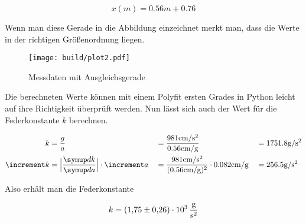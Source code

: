 \begin{equation}
x(m) = 0.56m + 0.76
\end{equation}
\begin{flushleft}
Wenn man diese Gerade in die Abbildung einzeichnet merkt man, dass die Werte in der richtigen Größenordnung liegen.
\end{flushleft}
\begin{figure}
  \centering
  \texttt{[image: build/plot2.pdf]}
  \caption{Messdaten mit Ausgleichsgerade}
  \label{fig:plot2}
\end{figure}
\begin{flushleft}
Die berechneten Werte können mit einem Polyfit ersten Grades in Python leicht auf ihre Richtigkeit überprüft werden.
Nun lässt sich auch der Wert für die Federkonstante $k$ berechnen.
\end{flushleft}
\begin{align}
k &= \frac{g}{a} &&= \frac{981\si[per-mode=symbol]{\centi\meter\per\second\squared}}{0.56\si[per-mode=symbol]{\centi\meter\per\gram}} &&= 1751.8\si[per-mode=symbol]{\gram\per\second\squared} \\
\increment k &= \Bigl| \frac{\dif{k}}{\dif{a}} \Bigr| \cdot \increment a &&= \frac{981\si[per-mode=symbol]{\centi\meter\per\second\squared}}{(0.56\si[per-mode=symbol]{\centi\meter\per\gram})^2} \cdot 0.082\si[per-mode=symbol]{\centi\meter\per\gram} &&=  256.5\si[per-mode=symbol]{\gram\per\second\squared}
\end{align}
\begin{flushleft}
Also erhält man die Federkonstante
\end{flushleft}
\begin{equation}
k = \SI{1{,}75(26)e3}{\gram\per\second\squared}
\end{equation}


